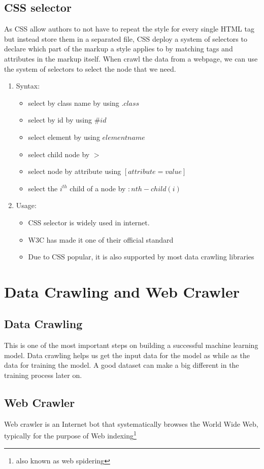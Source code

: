 \documentclass[11pt,a4paper]{report}
\begin{document}
	\subsection{CSS selector}
		As CSS allow authors to not have to repeat the style for every single HTML tag but instead store them in a separated file, CSS deploy a system of selectors to declare which part of the markup a style applies to by matching tags and attributes in the markup itself. When crawl the data from a webpage, we can use the system of selectors to select the node that we need.
		\begin{enumerate}
			\item Syntax:
			\begin{itemize}
				\item select by class name by using $.class$
				\item select by id by using $\#id$
				\item select element by using $elementname$
				\item select child node by $>$
				\item select node by attribute using  $[attribute = value]$
				\item select the $i^{th}$ child of a node by $:nth-child(i)$
			\end{itemize}
			\item Usage:
			\begin{itemize}
				\item CSS selector is widely used in internet. 
				\item W3C has made it one of their official standard
				\item Due to CSS popular, it is also supported by most data crawling libraries
			\end{itemize}
		\end{enumerate}
\section{Data Crawling and Web Crawler}
	\subsection{Data Crawling}
		This is one of the most important steps on building a successful machine learning model. Data crawling helps us get the input data for the model as while as the data for training the model. A good dataset can make a big different in the training process later on.
	\subsection{Web Crawler}
		Web crawler is an Internet bot that systematically browses the World Wide Web, typically for the purpose of Web indexing\footnote{ also known as web spidering}
\end{document}
